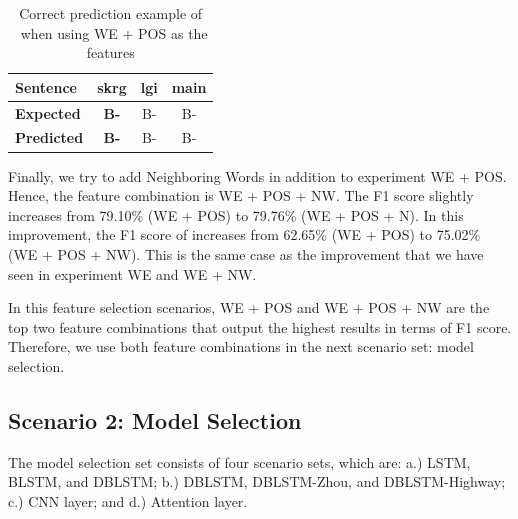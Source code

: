 \begin{table}
	\centering
	\caption{Correct prediction example of \timesrl~when using WE + POS as the features}
	\label{tab:timetrue}
	\begin{tabular}{|l|ccc|}
		\hline
		\textbf{Sentence} 				& skrg & lgi & main \\
		\hline
		\textbf{Expected}				& \textbf{B-\timesrl} & B-\modal & B-\predicate\\
		\hline
		\textbf{Predicted}		& \textbf{B-\timesrl} & B-\modal & B-\predicate \\
		\hline
	\end{tabular}
\end{table}

Finally, we try to add Neighboring Words in addition to experiment WE + POS. Hence, the feature combination is WE + POS + NW. The F1 score slightly increases from 79.10\% (WE + POS) to 79.76\% (WE + POS + N). In this improvement, the F1 score of \greet increases from 62.65\% (WE + POS) to 75.02\% (WE + POS + NW). This is the same case as the improvement that we have seen in experiment WE and WE + NW. 


In this feature selection scenarios, WE + POS and WE + POS + NW are the top two feature combinations that output the highest results in terms of F1 score. Therefore, we use both feature combinations in the next scenario set: model selection.

\subsection{Scenario 2: Model Selection}
The model selection set consists of four scenario sets, which are: a.) LSTM, BLSTM, and DBLSTM; b.) DBLSTM, DBLSTM-Zhou, and DBLSTM-Highway; c.) CNN layer; and d.) Attention layer.


